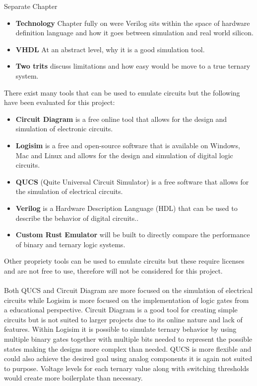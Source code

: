 \documentclass[12pt]{article}
\begin{document}
Separate Chapter
\begin{itemize}
    \item \textbf{Technology} Chapter fully on were Verilog sits within the space of hardware definition language and how it goes between simulation and real world silicon.
    \item \textbf{VHDL} At an abstract level, why it is a good simulation tool.
    \item \textbf{Two trits} discuss limitations and how easy would be move to a true ternary system.
\end{itemize}

There exist many tools that can be used to emulate circuits but the following have been evaluated for this project:
\begin{itemize}
    \item \textbf{Circuit Diagram} is a free online tool that allows for the design and simulation of electronic circuits.
    \item \textbf{Logisim} is a free and open-source software that is available on Windows, Mac and Linux and allows for the design and simulation of digital logic circuits.
    \item \textbf{QUCS} (Quite Universal Circuit Simulator) is a free software that allows for the simulation of electrical circuits.
    \item \textbf{Verilog} is a Hardware Description Language (HDL) that can be used to describe the behavior of digital circuits..
    \item \textbf{Custom Rust Emulator} will be built to directly compare the performance of binary and ternary logic systems.
\end{itemize}
Other propriety tools can be used to emulate circuits but these require licenses and are not free to use, 
therefore will not be considered for this project.\\
\\
Both QUCS and Circuit Diagram are more focused on the simulation of electrical circuits while Logisim is more focused on the implementation of 
logic gates from a educational perspective. Circuit Diagram is a good tool for creating simple circuits but is not suited to larger 
projects due to its online nature and lack of features. Within Logisim it is possible to simulate ternary behavior by using multiple binary gates together 
with multiple bits needed to represent the possible states making the designs more complex than needed. QUCS is more flexible and could also 
achieve the desired goal using analog components it is again not suited to purpose. Voltage levels for each ternary value along with switching 
thresholds would create more boilerplate than necessary.\\
\end{document}
